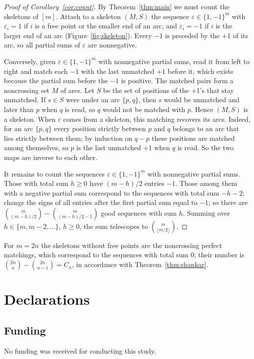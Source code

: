 \documentclass[11pt]{amsart}
\theoremstyle{definition}
\theoremstyle{remark}
\numberwithin{equation}{section}
\begin{document}
\begin{proof}[Proof of Corollary~\ref{cor:count}]
By Theorem~\ref{thm:main} we must count the skeletons of $[m]$. Attach to a skeleton $(M,S)$ the sequence $\varepsilon\in\{1,-1\}^m$ with $\varepsilon_i=1$ if $i$ is a free point or the smaller end of an arc, and $\varepsilon_i=-1$ if $i$ is the larger end of an arc (Figure~\ref{fig:skeleton}). Every $-1$ is preceded by the $+1$ of its arc, so all partial sums of $\varepsilon$ are nonnegative.

Conversely, given $\varepsilon\in\{1,-1\}^m$ with nonnegative partial sums, read it from left to right and match each $-1$ with the last unmatched $+1$ before it, which exists because the partial sum before the $-1$ is positive. The matched pairs form a noncrossing set $M$ of arcs. Let $S$ be the set of positions of the $+1$'s that stay unmatched. If $s\in S$ were under an arc $\{p,q\}$, then $s$ would be unmatched and later than $p$ when $q$ is read, so $q$ would not be matched with $p$. Hence $(M,S)$ is a skeleton. When $\varepsilon$ comes from a skeleton, this matching recovers its arcs. Indeed, for an arc $\{p,q\}$ every position strictly between $p$ and $q$ belongs to an arc that lies strictly between them; by induction on $q-p$ these positions are matched among themselves, so $p$ is the last unmatched $+1$ when $q$ is read. So the two maps are inverse to each other.

It remains to count the sequences $\varepsilon\in\{1,-1\}^m$ with nonnegative partial sums. Those with total sum $h\ge0$ have $(m-h)/2$ entries $-1$. Those among them with a negative partial sum correspond to the sequences with total sum $-h-2$: change the signs of all entries after the first partial sum equal to $-1$; so there are $\binom{m}{(m-h)/2}-\binom{m}{(m-h)/2-1}$ good sequences with sum $h$. Summing over $h\in\{m,m-2,\dots\}$, $h\ge0$, the sum telescopes to $\binom{m}{\lfloor m/2\rfloor}$.
\end{proof}

For $m=2n$ the skeletons without free points are the noncrossing perfect matchings, which correspond to the sequences with total sum $0$; their number is $\binom{2n}{n}-\binom{2n}{n-1}=C_n$, in accordance with Theorem~\ref{thm:shankar}.

\section*{Declarations}

\subsection*{Funding} No funding was received for conducting this study.
\end{document}
